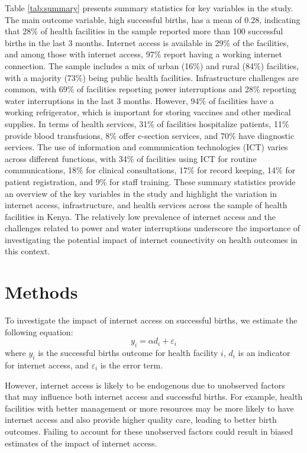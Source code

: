 \documentclass[12pt]{article}
\begin{document}
Table \ref{tab:summary} presents summary statistics for key variables in the study. The main outcome variable, high successful births, has a mean of 0.28, indicating that 28\% of health facilities in the sample reported more than 100 successful births in the last 3 months. Internet access is available in 29\% of the facilities, and among those with internet access, 97\% report having a working internet connection.
The sample includes a mix of urban (16\%) and rural (84\%) facilities, with a majority (73\%) being public health facilities. Infrastructure challenges are common, with 69\% of facilities reporting power interruptions and 28\% reporting water interruptions in the last 3 months. However, 94\% of facilities have a working refrigerator, which is important for storing vaccines and other medical supplies.
In terms of health services, 31\% of facilities hospitalize patients, 11\% provide blood transfusions, 8\% offer c-section services, and 70\% have diagnostic services. The use of information and communication technologies (ICT) varies across different functions, with 34\% of facilities using ICT for routine communications, 18\% for clinical consultations, 17\% for record keeping, 14\% for patient registration, and 9\% for staff training.
These summary statistics provide an overview of the key variables in the study and highlight the variation in internet access, infrastructure, and health services across the sample of health facilities in Kenya. The relatively low prevalence of internet access and the challenges related to power and water interruptions underscore the importance of investigating the potential impact of internet connectivity on health outcomes in this context.

\section{Methods}
To investigate the impact of internet access on successful births, we estimate the following equation:
\begin{equation}
  y_i = \alpha d_i + \varepsilon_i
  \label{eq:main}  
\end{equation}
where $y_i$ is the successful births outcome for health facility $i$, $d_i$ is an indicator for internet access, and $\varepsilon_i$ is the error term. 

However, internet access is likely to be endogenous due to unobserved factors that may influence both internet access and successful births. For example, health facilities with better management or more resources may be more likely to have internet access and also provide higher quality care, leading to better birth outcomes. Failing to account for these unobserved factors could result in biased estimates of the impact of internet access.
\end{document}
